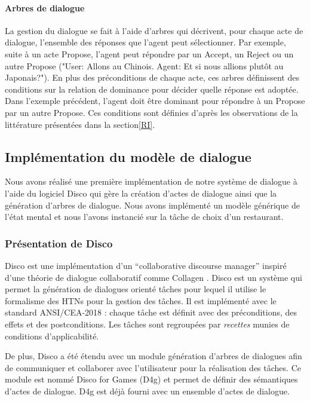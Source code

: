 \documentclass [french]{sig-alternate-05-2015}
\begin{document}
\paragraph{Arbres de dialogue}
La gestion du dialogue se fait à l'aide d'arbres qui décrivent, pour chaque acte de dialogue, l'ensemble des réponses que l'agent peut sélectionner. Par exemple, suite à un acte Propose, l'agent peut répondre par un Accept, un Reject ou un autre Propose ("User: Allons au Chinois. Agent: Et si nous allions plutôt au Japonais?"). En plus des préconditions de chaque acte, ces arbres définissent des conditions sur la relation de dominance pour décider quelle réponse est adoptée. Dans l'exemple précédent, l'agent doit être dominant pour répondre à un Propose par un autre Propose. Ces conditions sont définies d'après les observations de la littérature présentées dans la section\ref{RI}.


\subsection{Implémentation du modèle de dialogue}

\par Nous avons réalisé une première implémentation de notre système de dialogue à l'aide du logiciel Disco \cite{rich2009building} qui gère la création d'actes de dialogue ainsi que la génération d'arbres de dialogue. Nous avons implémenté un modèle générique de l'état mental et nous l'avons instancié sur la tâche de choix d'un restaurant.

\subsubsection{Présentation de Disco}
Disco est une implémentation d'un ``collaborative discourse manager'' inspiré d'une théorie de dialogue collaboratif comme Collagen \cite{collagen}. Disco est un système qui permet la génération de dialogues orienté tâches pour lequel il utilise le formalisme des HTNs \cite{htn} pour la gestion des tâches. Il est implémenté avec le standard ANSI/CEA-2018 : chaque tâche est définit avec des préconditions, des effets et des postconditions. Les tâches sont regroupées par \emph{recettes} munies de conditions d'applicabilité.

De plus, Disco a été étendu avec un module génération d'arbres de dialogues afin de communiquer et collaborer avec l'utilisateur pour la réalisation des tâches. Ce module est nommé Disco for Games (D4g) et permet de définir des sémantiques d'actes de dialogue. D4g est déjà fourni avec un ensemble d'actes de dialogue.
\end{document}
